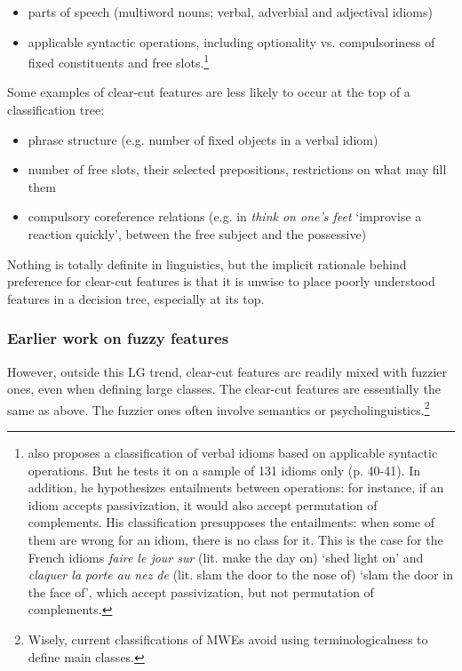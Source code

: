 \documentclass[output=paper]{langsci/langscibook}
\begin{document}
\begin{itemize}
\item parts of speech (multiword nouns; verbal, adverbial and adjectival idioms) 
\item applicable syntactic operations, including optionality vs. compulsoriness of fixed constituents and free slots.\footnote{ \citet[39]{Fraser1970} also proposes a classification of verbal idioms based on applicable syntactic operations. But he tests it on a sample of 131 idioms only (p. 40-41). In addition, he hypothesizes entailments between operations: for instance, if an idiom accepts passivization, it would also accept permutation of complements. His classification presupposes the entailments: when some of them are wrong for an idiom, there is no class for it. This is the case for the French idioms \textit{faire le jour sur} (lit. make the day on) ‘shed light on’ and \textit{claquer la porte au nez de} (lit. slam the door to the nose of) ‘slam the door in the face of’, which accept passivization, but not permutation of complements.}
\end{itemize}

\noindent Some examples of clear-cut features are less likely to occur at the top of a classification tree:

\begin{itemize}
\item phrase structure (e.g. number of fixed objects in a verbal idiom) 
\item number of free slots, their selected prepositions, restrictions on what may fill them
\item compulsory coreference relations (e.g. in \textit{think on one’s feet} ‘improvise a reaction quickly’, between the free subject and the possessive)
\end{itemize}

Nothing is totally definite in linguistics, but the implicit rationale behind preference for clear-cut features is that it is unwise to place poorly understood features in a decision tree, especially at its top.

\subsubsection{Earlier work on fuzzy features}
\label{earlierfuzzyfeat}

However, outside this LG trend, clear-cut features are readily mixed with fuzzier ones, even when defining large classes. The clear-cut features are essentially the same as above. The fuzzier ones often involve semantics or psycholinguistics.\footnote{ Wisely, current classifications of MWEs avoid using terminologicalness to define main classes.}
 
\end{document}
